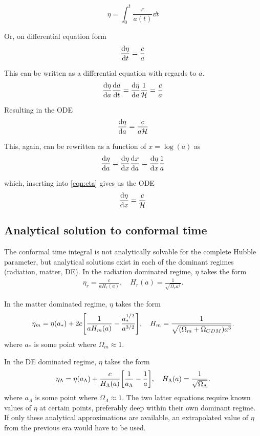 \documentclass[10pt, a4paper]{article}
\begin{document}
\begin{equation}
    \eta = \int_0^t \frac{c}{a(t)} \dd{t}
\end{equation}

Or, on differential equation form
\begin{equation}
    \dv{\eta}{t} = \frac{c}{a}
\end{equation}

This can be written as a differential equation with regards to $a$.
\begin{equation*}
    \dv{\eta}{a}\dv{a}{t} = \dv{\eta}{a}\frac{1}{\mathcal{H}} = \frac{c}{a}
\end{equation*}

Resulting in the ODE
\begin{align}\label{eqn:eta}
    \dv{\eta}{a} = \frac{c}{a\mathcal{H}}
\end{align}

This, again, can be rewritten as a function of $x = \log(a)$ as
\begin{align*}
    \dv{\eta}{a} = \dv{\eta}{x}\dv{x}{a} = \dv{\eta}{x}\frac{1}{a}
\end{align*}

which, inserting into \ref{eqn:eta} gives us the ODE
\begin{align}\label{eqn:etaODE}
    \dv{\eta}{x} = \frac{c}{\mathcal{H}}
\end{align}


\subsection{Analytical solution to conformal time}\label{sec:conf}
The conformal time integral is not analytically solvable for the complete Hubble parameter, but analytical solutions exist in each of the dominant regimes (radiation, matter, DE). In the radiation dominated regime, $\eta$ takes the form
\begin{align}
    \eta_r = \frac{c}{aH_r(a)},  \quad  H_r(a) = \frac{1}{\sqrt{\Omega_r a^{4}}}.
\end{align}

In the matter dominated regime, $\eta$ takes the form
\begin{align}
    \eta_m = \eta(a_*) + 2c\qty[\frac{1}{aH_m(a)} - \frac{a_*^{1/2}}{a^{3/2}}], \quad H_m = \frac{1}{\sqrt{(\Omega_m + \Omega_{CDM}) a^3}}.
\end{align}
where $a_*$ is some point where $\Omega_m \approx 1$.

In the DE dominated regime, $\eta$ takes the form
\begin{align}
    \eta_\Lambda = \eta(a_\Lambda) + \frac{c}{H_\Lambda(a)}\qty[\frac{1}{a_\Lambda} - \frac{1}{a}], \quad H_\Lambda(a) = \frac{1}{\sqrt{\Omega_\Lambda}}.
\end{align}
where $a_\Lambda$ is some point where $\Omega_\Lambda \approx 1$. The two latter equations require known values of $\eta$ at certain points, preferably deep within their own dominant regime. If only these analytical approximations are available, an extrapolated value of $\eta$ from the previous era would have to be used.
\end{document}
